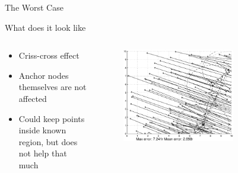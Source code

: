 \documentclass{beamer}
\begin{document}
\begin{frame}{The Worst Case}
\begin{block}{What does it look like}
\begin{columns}
	\begin{column}{0.3\textwidth}
		\begin{itemize}
		\item Criss-cross effect
		\item Anchor nodes themselves are not affected
		\item Could keep points inside known region, but does not help that much
		\end{itemize}
		\vfil
	\end{column}
	\begin{column}{0.7\textwidth}
		\begin{figure}
			\centering
				\includegraphics[width=0.7\textwidth]{AS6NetworkDiff9}
		\end{figure}
	\end{column}
\end{columns}
\end{block}
\end{frame}
\end{document}
